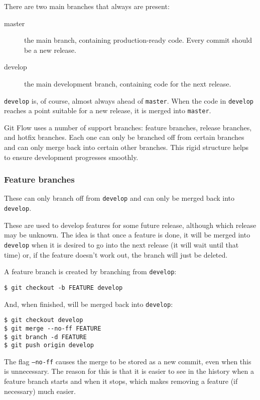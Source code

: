 \documentclass[12pt,a4paper]{article}
\begin{document}
There are two main branches that always are present:

\begin{description}
  \item[master] the main branch, containing production-ready
    code. Every commit should be a new release.
  \item[develop] the main development branch, containing code for the
    next release.
\end{description}

\texttt{develop} is, of course, almost always ahead of
\texttt{master}. When the code in \texttt{develop} reaches a point
suitable for a new release, it is merged into \texttt{master}.

Git Flow uses a number of support branches: feature branches, release
branches, and hotfix branches. Each one can only be branched off from
certain branches and can only merge back into certain other
branches. This rigid structure helps to ensure development progresses
smoothly.

\subsubsection{Feature branches}

These can only branch off from \texttt{develop} and can only be merged
back into \texttt{develop}.

These are used to develop features for some future release, although
which release may be unknown. The idea is that once a feature is done,
it will be merged into \texttt{develop} when it is desired to go into
the next release (it will wait until that time) or, if the feature
doesn't work out, the branch will just be deleted.

A feature branch is created by branching from \texttt{develop}:

\begin{verbatim}
$ git checkout -b FEATURE develop
\end{verbatim}

And, when finished, will be merged back into \texttt{develop}:

\begin{verbatim}
$ git checkout develop
$ git merge --no-ff FEATURE
$ git branch -d FEATURE
$ git push origin develop
\end{verbatim}

The flag \texttt{--no-ff} causes the merge to be stored as a new
commit, even when this is unnecessary. The reason for this is that it
is easier to see in the history when a feature branch starts and when
it stops, which makes removing a feature (if necessary) much easier.
\end{document}

